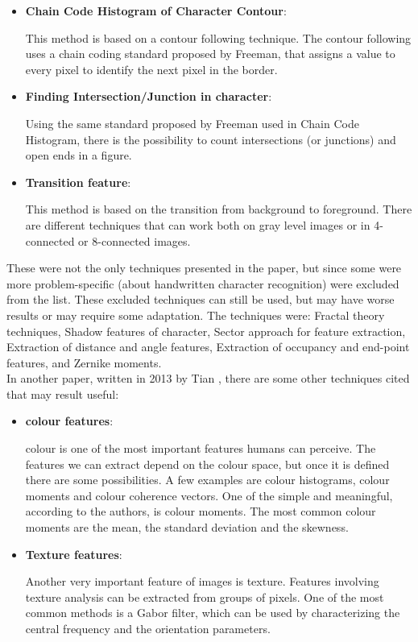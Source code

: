 \documentclass[conference]{IEEEtran}
\begin{document}
\begin{itemize}
						\item \textbf{Chain Code Histogram of Character Contour}:
						
							This method is based on a contour following technique. 
							The contour following uses a chain coding standard proposed by Freeman, that assigns a value to every pixel to identify the next pixel in the border.

						\item \textbf{Finding Intersection/Junction in character}:
						
							Using the same standard proposed by Freeman used in Chain Code Histogram, there is the possibility to count intersections (or junctions) and open ends in a figure.					
							
						\item \textbf{Transition feature}:
						
							This method is based on the transition from background to foreground. 
							There are different techniques that can work both on gray level images or in 4-connected or 8-connected images.
						
					\end{itemize}
				
				
				\noindent These were not the only techniques presented in the paper, but since some were more problem-specific (about handwritten character recognition)
				were excluded from the list. These excluded techniques can still be used, but may have worse results or may require some adaptation. 
				The techniques were: Fractal theory techniques, Shadow features of character, Sector approach for feature extraction, 
				Extraction of distance and angle features, Extraction of occupancy and end-point features, and Zernike moments.\\
				In another paper, written in 2013 by Tian \cite{ping2013review}, there are some other techniques cited that may result useful:
				
				\begin{itemize}
				
					\item \textbf{colour features}:
						
						colour is one of the most important features humans can perceive. 
						The features we can extract depend on the colour space, but once it is defined there are some possibilities. 
						A few examples are colour histograms, colour moments and colour coherence vectors. 
						One of the simple and meaningful, according to the authors, is colour moments. 
						The most common colour moments are the mean, the standard deviation and the skewness. 
						
					\item \textbf{Texture features}:
					
						Another very important feature of images is texture. 
						Features involving texture analysis can be extracted from groups of pixels. 
						One of the most common methods is a Gabor filter, which can be used by characterizing the central frequency and the orientation parameters.
				
				\end{itemize}
				
\end{document}
